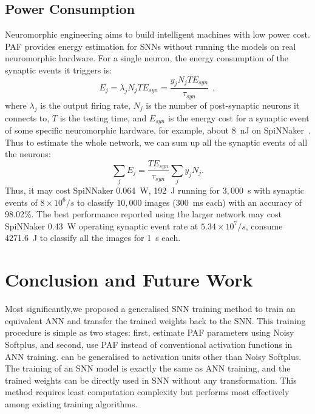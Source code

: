 \documentclass{article}
\begin{document}
\subsection{Power Consumption}
Neuromorphic engineering aims to build intelligent machines with low power cost.
PAF provides energy estimation for SNNs without running the models on real neuromorphic hardware.
For a single neuron, the energy consumption of the synaptic events it triggers is:
\begin{equation}
E_{j} = \lambda_j N_j T E_{syn} = \dfrac{y_j N_j T E_{syn}}{\tau_{syn}}~~,
\label{equ:energy}
\end{equation}
where $\lambda_j$ is the output firing rate, $N_j$ is the number of post-synaptic neurons it connects to, $T$ is the testing time, and $E_{syn}$ is the energy cost for a synaptic event of some specific neuromorphic hardware, for example, about 8~nJ on SpiNNaker~\cite{stromatias2013power}.
Thus to estimate the whole network, we can sum up all the synaptic events of all the neurons:
\begin{equation}
\sum_j E_{j} =  \dfrac{T E_{syn}}{\tau_{syn}} \sum_{j}y_j N_j.
\end{equation}
Thus, it may cost SpiNNaker 0.064~W, 192~J running for $3,000$~s with synaptic events of $8\times10^6/s$ to classify $10,000$ images (300~ms each) with an accuracy of 98.02\%.
The best performance reported using the larger network may cost SpiNNaker 0.43~W operating synaptic event rate at $5.34\times10^7/s$, consume 4271.6~J to classify all the images for 1~s each.

\section{Conclusion and Future Work}
Most significantly,we proposed a generalised SNN training method to train an equivalent ANN and transfer the trained weights back to the SNN.
This training procedure is simple as two stages: first, estimate PAF parameters using Noisy Softplus, and second, use PAF instead of conventional activation functions in ANN training. can be generalised to activation units other than Noisy Softplus.
The training of an SNN model is exactly the same as ANN training, and the trained weights can be directly used in SNN without any transformation.
This method requires least computation complexity but performs most effectively among existing training algorithms.
\end{document}
